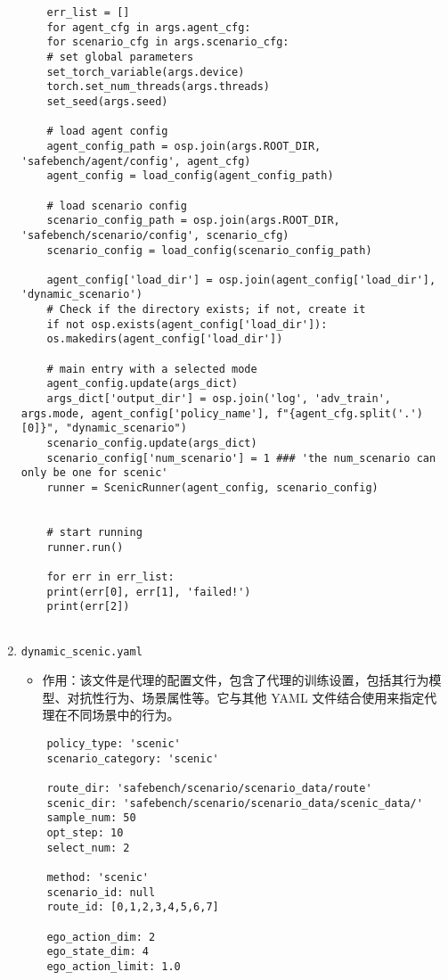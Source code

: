 \begin{enumerate}
\begin{verbatim}
	err_list = []
	for agent_cfg in args.agent_cfg:
	for scenario_cfg in args.scenario_cfg:
	# set global parameters
	set_torch_variable(args.device)
	torch.set_num_threads(args.threads)
	set_seed(args.seed)
	
	# load agent config
	agent_config_path = osp.join(args.ROOT_DIR, 'safebench/agent/config', agent_cfg)
	agent_config = load_config(agent_config_path)
	
	# load scenario config
	scenario_config_path = osp.join(args.ROOT_DIR, 'safebench/scenario/config', scenario_cfg)
	scenario_config = load_config(scenario_config_path)
	
	agent_config['load_dir'] = osp.join(agent_config['load_dir'], 'dynamic_scenario')
	# Check if the directory exists; if not, create it
	if not osp.exists(agent_config['load_dir']):
	os.makedirs(agent_config['load_dir'])        
	
	# main entry with a selected mode
	agent_config.update(args_dict)
	args_dict['output_dir'] = osp.join('log', 'adv_train', args.mode, agent_config['policy_name'], f"{agent_cfg.split('.')[0]}", "dynamic_scenario")
	scenario_config.update(args_dict)
	scenario_config['num_scenario'] = 1 ### 'the num_scenario can only be one for scenic'
	runner = ScenicRunner(agent_config, scenario_config)
	
	
	# start running
	runner.run()
	
	for err in err_list:
	print(err[0], err[1], 'failed!')
	print(err[2])
	

	\end{verbatim}
	
	\item \texttt{dynamic\_scenic.yaml}
	\begin{itemize}
		\item 作用：该文件是代理的配置文件，包含了代理的训练设置，包括其行为模型、对抗性行为、场景属性等。它与其他 YAML 文件结合使用来指定代理在不同场景中的行为。
	\end{itemize}
	\begin{verbatim}
	policy_type: 'scenic'
	scenario_category: 'scenic'
	
	route_dir: 'safebench/scenario/scenario_data/route'
	scenic_dir: 'safebench/scenario/scenario_data/scenic_data/'
	sample_num: 50
	opt_step: 10
	select_num: 2
	
	method: 'scenic'
	scenario_id: null
	route_id: [0,1,2,3,4,5,6,7]
	
	ego_action_dim: 2
	ego_state_dim: 4
	ego_action_limit: 1.0
	
	\end{verbatim}
\end{enumerate}

